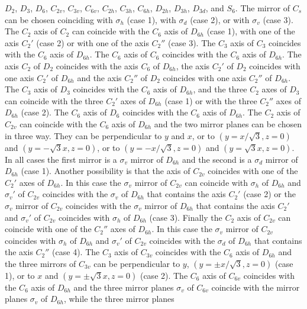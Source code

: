 \documentclass[12pt,a4paper]{article}
\begin{document}
$D_2$, $D_3$, $D_6$, $C_{2v}$, $C_{3v}$, $C_{6v}$, $C_{2h}$, $C_{3h}$, 
$C_{6h}$, $D_{2h}$, $D_{3h}$, $D_{3d}$, and $S_6$. 
The mirror of $C_s$ can be chosen coinciding with $\sigma_h$ (case 1), 
with $\sigma_d$ (case 2), or with $\sigma_v$ (case 3). The $C_2$ axis of 
$C_2$ can coincide with the $C_6$ axis of $D_{6h}$ (case 1), with one 
of the axis $C_2'$ (case 2) or with one of the axis
$C_2''$ (case 3). The $C_3$ axis of $C_3$ coincides with the $C_6$ axis of 
$D_{6h}$. The $C_6$ axis of $C_6$ coincides with the $C_6$ axis of 
$D_{6h}$. The axis $C_2$ of $D_2$ coincides with the axis $C_6$ of $D_{6h}$,
the axis $C_2'$ of $D_2$ coincides with one axis $C_2'$ of $D_{6h}$ and
the axis $C_2''$ of $D_2$ coincides with one axis $C_2''$ of $D_{6h}$.
The $C_3$ axis of $D_3$ coincides with the $C_6$ axis of $D_{6h}$, and
the three $C_2$ axes of $D_3$ can coincide with the three $C_2'$ axes of
$D_{6h}$ (case 1) or with the three $C_2''$ axes of $D_{6h}$ (case 2). 
The $C_6$ axis of $D_6$ coincides with the $C_6$ axis of $D_{6h}$. The $C_2$ 
axis of $C_{2v}$ can coincide with the $C_6$ axis of $D_{6h}$ and the two 
mirror planes can be chosen in three way. They can be perpendicular to $y$ and $x$, 
or to $(y=x/\sqrt{3}, z=0)$ and $(y=-\sqrt{3} x, z=0)$, or to
$(y=-x/\sqrt{3}, z=0)$ and $(y=\sqrt{3} x, z=0)$. In all cases 
the first mirror is a $\sigma_v$ mirror of $D_{6h}$ and the
second is a $\sigma_d$ mirror of $D_{6h}$ (case 1). 
Another possibility is that the axis of $C_{2v}$ coincides
with one of the $C_2'$ axes of $D_{6h}$. In this case the $\sigma_v$ mirror
of $C_{2v}$ can coincide with $\sigma_h$ of $D_{6h}$ and 
$\sigma_v'$ of $C_{2v}$ coincides with the $\sigma_v$ of $D_{6h}$ 
that contains the axis $C_2'$ (case 2) or the $\sigma_v$ mirror
of $C_{2v}$ coincides with the $\sigma_v$ mirror of $D_{6h}$ 
that contains the axis $C_2'$ and $\sigma_v'$ of $C_{2v}$ coincides 
with $\sigma_h$ of $D_{6h}$ (case 3). 
Finally the $C_2$ axis of $C_{2v}$ can coincide
with one of the $C_2''$ axes of $D_{6h}$. In this case the $\sigma_v$ mirror of
$C_{2v}$ coincides with $\sigma_h$ of $D_{6h}$ and $\sigma_v'$ of
$C_{2v}$ coincides with the $\sigma_d$ of $D_{6h}$ that contains the axis 
$C_2''$ (case 4). The $C_3$ axis of $C_{3v}$ coincides with the $C_6$ axis of
$D_{6h}$ and the three mirrors of $C_{3v}$ can be perpendicular to $y$, 
$(y=\pm x/\sqrt{3}, z=0)$ (case 1), or to $x$ and $(y=\pm \sqrt{3} x, z=0)$
(case 2). The $C_6$ axis of $C_{6v}$ coincides with the $C_6$ axis of
$D_{6h}$ and the three mirror planes $\sigma_v$ of $C_{6v}$ coincide with the
mirror planes $\sigma_v$ of $D_{6h}$, while the three mirror planes
\end{document}
